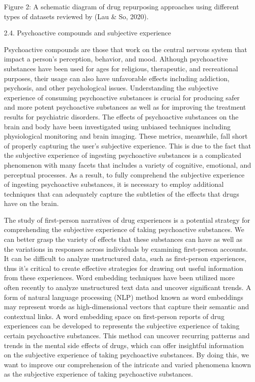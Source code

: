 \documentclass[
]{article}
\begin{document}
\hfill\break

Figure 2: A schematic diagram of drug repurposing approaches using
different types of datasets reviewed by (Lau \& So, 2020).

2.4. Psychoactive compounds and subjective experience

Psychoactive compounds are those that work on the central nervous system
that impact a person's perception, behavior, and mood. Although
psychoactive substances have been used for ages for religious,
therapeutic, and recreational purposes, their usage can also have
unfavorable effects including addiction, psychosis, and other
psychological issues. Understanding the subjective experience of
consuming psychoactive substances is crucial for producing safer and
more potent psychoactive substances as well as for improving the
treatment results for psychiatric disorders. The effects of psychoactive
substances on the brain and body have been investigated using unbiased
techniques including physiological monitoring and brain imaging. These
metrics, meanwhile, fall short of properly capturing the user's
subjective experience. This is due to the fact that the subjective
experience of ingesting psychoactive substances is a complicated
phenomenon with many facets that includes a variety of cognitive,
emotional, and perceptual processes. As a result, to fully comprehend
the subjective experience of ingesting psychoactive substances, it is
necessary to employ additional techniques that can adequately capture
the subtleties of the effects that drugs have on the brain.

The study of first-person narratives of drug experiences is a potential
strategy for comprehending the subjective experience of taking
psychoactive substances. We can better grasp the variety of effects that
these substances can have as well as the variations in responses across
individuals by examining first-person accounts. It can be difficult to
analyze unstructured data, such as first-person experiences, thus it's
critical to create effective strategies for drawing out useful
information from these experiences. Word embedding techniques have been
utilized more often recently to analyze unstructured text data and
uncover significant trends. A form of natural language processing (NLP)
method known as word embeddings may represent words as high-dimensional
vectors that capture their semantic and contextual links. A word
embedding space on first-person reports of drug experiences can be
developed to represents the subjective experience of taking certain
psychoactive substances. This method can uncover recurring patterns and
trends in the mental side effects of drugs, which can offer insightful
information on the subjective experience of taking psychoactive
substances. By doing this, we want to improve our comprehension of the
intricate and varied phenomena known as the subjective experience of
taking psychoactive substances.
\end{document}
